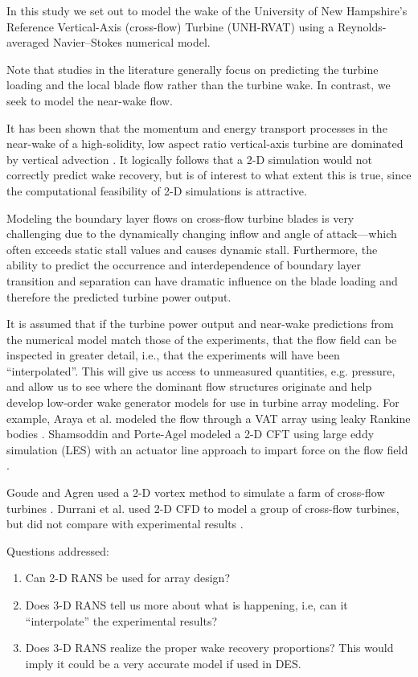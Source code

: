 \documentclass[aip,graphicx]{revtex4-1}
\begin{document}
In this study we set out to model the wake of the University of New Hampshire's
Reference Vertical-Axis (cross-flow) Turbine (UNH-RVAT) using a
Reynolds-averaged Navier--Stokes numerical model.

Note that studies in the literature generally focus on predicting the turbine
loading and the local blade flow rather than the turbine wake. In contrast, we
seek to model the near-wake flow.

It has been shown that the momentum and energy transport processes in the
near-wake of a high-solidity, low aspect ratio vertical-axis turbine are
dominated by vertical advection \cite{Bachant2015-JoT}. It logically follows
that a 2-D simulation would not correctly predict wake recovery, but is of
interest to what extent this is true, since the computational feasibility of 2-D
simulations is attractive.

Modeling the boundary layer flows on cross-flow turbine blades is very
challenging due to the dynamically changing inflow and angle of attack---which
often exceeds static stall values and causes dynamic stall. Furthermore, the
ability to predict the occurrence and interdependence of boundary layer
transition and separation can have dramatic influence on the blade loading and
therefore the predicted turbine power output.

It is assumed that if the turbine power output and near-wake predictions from
the numerical model match those of the experiments, that the flow field can be
inspected in greater detail, i.e., that the experiments will have been
``interpolated''. This will give us access to unmeasured quantities, e.g.
pressure, and allow us to see where the dominant flow structures originate and
help develop low-order wake generator models for use in turbine array modeling.
For example, Araya et al. modeled the flow through a VAT array using leaky
Rankine bodies \cite{Araya2014}. Shamsoddin and Porte-Agel modeled a 2-D CFT
using large eddy simulation (LES) with an actuator line approach to impart force
on the flow field \cite{Shamsoddin2014}.

Goude and Agren used a 2-D vortex method to simulate a farm of cross-flow
turbines \cite{Goude2010}. Durrani et al. used 2-D CFD to model a group of
cross-flow turbines, but did not compare with experimental results
\cite{Durrani2011}.

Questions addressed:

\begin{enumerate}

    \item Can 2-D RANS be used for array design?

    \item Does 3-D RANS tell us more about what is happening, i.e, can it
    ``interpolate'' the experimental results?

    \item Does 3-D RANS realize the proper wake recovery proportions? This would
    imply it could be a very accurate model if used in DES.

\end{enumerate}
\end{document}
